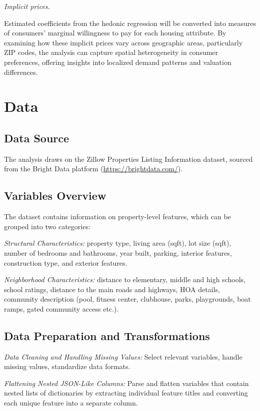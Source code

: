 \documentclass[11pt]{article}
\begin{document}
\textit{Implicit prices.} 

Estimated coefficients from the hedonic regression will be converted into measures of consumers’ marginal willingness to pay for each housing attribute. By examining how these implicit prices vary across geographic areas, particularly ZIP codes, the analysis can capture spatial heterogeneity in consumer preferences, offering insights into localized demand patterns and valuation differences.

\section{Data}

\subsection{Data Source}

The analysis draws on the Zillow Properties Listing Information dataset, sourced from the Bright Data platform (\url{https://brightdata.com/}). 

\subsection{Variables Overview}

The dataset contains information on property-level features, which can be grouped into two categories:

\textit{Structural Characteristics:} property type, living area (sqft), lot size (sqft), number of bedrooms and bathrooms, year built, parking, interior features, construction type, and exterior features.
    
\textit{Neighborhood Characteristics:} distance to elementary, middle and high schools, school ratings, distance to the main roads and highways, HOA details, community description (pool, fitness center, clubhouse, parks, playgrounds, boat ramps, gated community access etc.). 
    

\subsection{Data Preparation and Transformations}

\textit{Data Cleaning and Handling Missing Values:} Select relevant variables, handle missing values, standardize data formats.

\textit{Flattening Nested JSON-Like Columns:}
Parse and flatten variables that contain nested lists of dictionaries by extracting individual feature titles and converting each unique feature into a separate column. 
    
\end{document}
